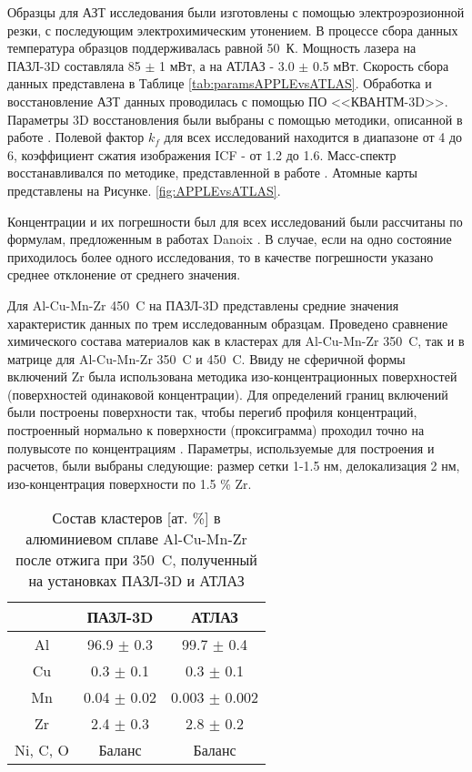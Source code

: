 Образцы для АЗТ исследования были изготовлены с помощью электроэрозионной резки, с последующим электрохимическим утонением. В процессе сбора данных температура образцов поддерживалась равной 50~К. Мощность лазера на  ПАЗЛ-3D составляла 85 $\pm$ 1 мВт, а на АТЛАЗ - 3.0 $\pm$ 0.5 мВт. Скорость сбора данных представлена в Таблице \cref{tab:paramsAPPLEvsATLAS}. Обработка и восстановление АЗТ данных проводилась с помощью ПО <<КВАНТМ-3D>>. Параметры 3D восстановления были выбраны с помощью методики, описанной в работе \cite{scbibDensity}. Полевой фактор $k_f$ для всех исследований находится в диапазоне от 4 до 6, коэффициент сжатия изображения ICF  - от 1.2 до 1.6. Масс-спектр восстанавливался по методике, представленной в работе \cite{Shutov19}. Атомные карты представлены на Рисунке.  \cref{fig:APPLEvsATLAS}.



Концентрации и их погрешности был для всех исследований были рассчитаны по формулам, предложенным в работах Danoix \cite{Danoix071,Danoix072}. В случае, если на одно состояние приходилось более одного исследования, то в качестве погрешности указано среднее отклонение от среднего значения. 





Для Al-Cu-Mn-Zr 450~\textdegree C на ПАЗЛ-3D представлены средние значения характеристик данных по трем исследованным образцам. Проведено сравнение химического состава материалов как в кластерах для Al-Cu-Mn-Zr 350~\textdegree C, так и в матрице для Al-Cu-Mn-Zr 350~\textdegree C и 450~\textdegree C. Ввиду не сферичной формы включений Zr была использована методика изо-концентрационных поверхностей (поверхностей одинаковой концентрации). Для определений границ включений были построены поверхности так, чтобы перегиб профиля концентраций, построенный нормально к поверхности (проксиграмма) проходил точно на полувысоте по концентрациям \cite{Hellman07}. Параметры, используемые для построения и расчетов, были выбраны следующие: размер сетки 1-1.5 нм, делокализация 2 нм, изо-концентрация поверхности по 1.5 \% Zr. 

\begin{table} [htbp]
	\centering
	\caption{Состав кластеров [ат. \%] в алюминиевом сплаве Al-Cu-Mn-Zr после отжига при 350~\textdegree C, полученный
		на установках ПАЗЛ-3D и АТЛАЗ}
	\label{tab:clustersAPPLEvsATLAS}
	\begin{SingleSpace}
		\begin{tabular} {| c | c | c |}
			\hline
			{} & ПАЗЛ-3D & АТЛАЗ \\ \hline
			Al       & 96.9 $\pm$ 0.3  & 99.7 $\pm$ 0.4   \\ \hline
			Cu       & 0.3 $\pm$ 0.1   & 0.3 $\pm$ 0.1    \\ \hline
			Mn       & 0.04 $\pm$ 0.02 & 0.003 $\pm$ 0.002  \\ \hline
			Zr       & 2.4 $\pm$ 0.3   & 2.8 $\pm$ 0.2    \\ \hline
			Ni, C, O & Баланс & Баланс   \\ \hline			
		\end{tabular}
	\end{SingleSpace}
\end{table}

